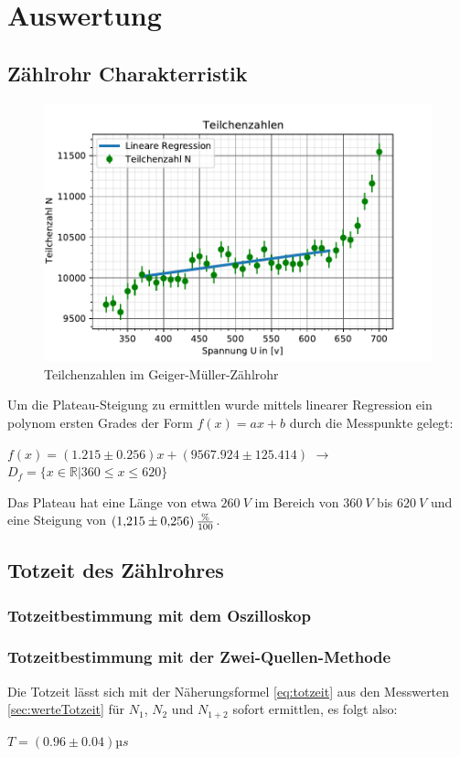 \section{Auswertung}
\label{sec:auswertung}

\subsection{Zählrohr Charakterristik}
\label{sec:characteristik}

\begin{figure}
    \centering
    \includegraphics{kennlinie.pdf}
    \caption{Teilchenzahlen im Geiger-Müller-Zählrohr}
    \label{fig:teilchenzahl}
  \end{figure}
Um die Plateau-Steigung zu ermittlen wurde mittels linearer Regression ein polynom ersten Grades der 
Form $f(x)=ax+b$ durch die Messpunkte gelegt:
\begin{center}
    $f(x)=(1.215\pm0.256)x + (9567.924\pm125.414)$ $\rightarrow$ $D_f=\{x\in\mathbb{R} \vert 360\le x\le620\}$    
\end{center}
Das Plateau hat eine Länge von etwa $\SI{260}{V}$ im Bereich von $\SI{360}{V}$ bis $\SI{620}{V}$ und  eine 
Steigung von $\SI{1,215\pm0,256}{\frac{\%}{100}}$.
\subsection{Totzeit des Zählrohres}
\label{sec:totzeit}
\subsubsection{Totzeitbestimmung mit dem Oszilloskop}
\label{sec:totzeitO}
\subsubsection{Totzeitbestimmung mit der Zwei-Quellen-Methode}
\label{sec:totzeitZ}
Die Totzeit lässt sich mit der Näherungsformel \autoref{eq:totzeit} aus den Messwerten 
\autoref{sec:werteTotzeit} für $N_1$, $N_2$ und $N_{1+2}$ sofort ermittlen, es folgt also:
\begin{center}
  $T=(0.96\pm0.04) µs$
\end{center}

